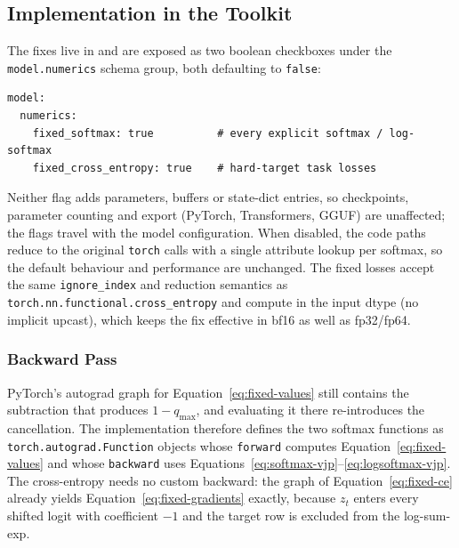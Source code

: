 \subsection{Implementation in the Toolkit}
\label{sec:fixed-implementation}

The fixes live in  and are exposed as two boolean checkboxes under the \texttt{model.numerics} schema group, both defaulting to \texttt{false}:

\begin{verbatim}
model:
  numerics:
    fixed_softmax: true          # every explicit softmax / log-softmax
    fixed_cross_entropy: true    # hard-target task losses
\end{verbatim}

Neither flag adds parameters, buffers or state-dict entries, so checkpoints, parameter counting and export (PyTorch, Transformers, GGUF) are unaffected; the flags travel with the model configuration. When disabled, the code paths reduce to the original \texttt{torch} calls with a single attribute lookup per softmax, so the default behaviour and performance are unchanged. The fixed losses accept the same \texttt{ignore\_index} and reduction semantics as \texttt{torch.nn.functional.cross\_entropy} and compute in the input dtype (no implicit upcast), which keeps the fix effective in bf16 as well as fp32/fp64.

\subsubsection{Backward Pass}

PyTorch's autograd graph for Equation~\ref{eq:fixed-values} still contains the subtraction that produces $1 - q_{\max}$, and evaluating it there re-introduces the cancellation. The implementation therefore defines the two softmax functions as \texttt{torch.autograd.Function} objects whose \texttt{forward} computes Equation~\ref{eq:fixed-values} and whose \texttt{backward} uses Equations~\ref{eq:softmax-vjp}--\ref{eq:logsoftmax-vjp}. The cross-entropy needs no custom backward: the graph of Equation~\ref{eq:fixed-ce} already yields Equation~\ref{eq:fixed-gradients} exactly, because $z_t$ enters every shifted logit with coefficient $-1$ and the target row is excluded from the log-sum-exp.

